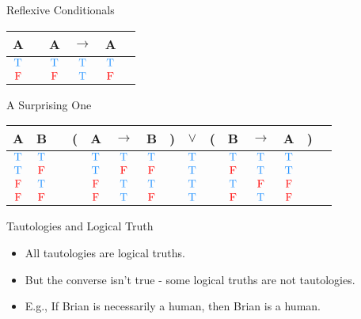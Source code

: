 \documentclass[
  ignorenonframetext,
]{beamer}
\providecommand{\tightlist}{%
  \setlength{\itemsep}{0pt}\setlength{\parskip}{0pt}}
\renewcommand{\,}{\text{, }}
\def\True{\textcolor{dodgerblue}{\text{T}}}
\def\False{\textcolor{red}{\text{F}}}
\begin{document}
\begin{frame}{Reflexive Conditionals}
\protect\hypertarget{reflexive-conditionals}{}

\begin{center}
\begin{tabular}{@{ }c | c@{ }@{ }c@{ }@{ }c@{ }@{ }c@{ }@{ }c}
A &  & A & $\rightarrow$ & A & \\
\hline 
$\True$ &  & $\True$ & \textcolor{red}{$\True$} & $\True$ & \\
$\False$ &  & $\False$ & \textcolor{red}{$\True$} & $\False$ & \\
\end{tabular}
\end{center}

\end{frame}

\begin{frame}{A Surprising One}
\protect\hypertarget{a-surprising-one}{}

\begin{center}
\begin{tabular}{@{ }c@{ }@{ }c | c@{ }@{}c@{}@{ }c@{ }@{ }c@{ }@{ }c@{ }@{}c@{}@{ }c@{ }@{}c@{}@{ }c@{ }@{ }c@{ }@{ }c@{ }@{}c@{}@{ }c}
A & B &  & ( & A & $\rightarrow$ & B & ) & $\lor$ & ( & B & $\rightarrow$ & A & ) & \\
\hline 
$\True$ & $\True$ &  &  & $\True$ & $\True$ & $\True$ &  & \textcolor{red}{$\True$} &  & $\True$ & $\True$ & $\True$ &  & \\
$\True$ & $\False$ &  &  & $\True$ & $\False$ & $\False$ &  & \textcolor{red}{$\True$} &  & $\False$ & $\True$ & $\True$ &  & \\
$\False$ & $\True$ &  &  & $\False$ & $\True$ & $\True$ &  & \textcolor{red}{$\True$} &  & $\True$ & $\False$ & $\False$ &  & \\
$\False$ & $\False$ &  &  & $\False$ & $\True$ & $\False$ &  & \textcolor{red}{$\True$} &  & $\False$ & $\True$ & $\False$ &  & \\
\end{tabular}
\end{center}

\end{frame}

\begin{frame}{Tautologies and Logical Truth}
\protect\hypertarget{tautologies-and-logical-truth}{}

\begin{itemize}
\tightlist
\item
  All tautologies are logical truths.
\item
  But the converse isn't true - some logical truths are not tautologies.
\item
  E.g., If Brian is necessarily a human, then Brian is a human.
\end{itemize}

\end{frame}
\end{document}
